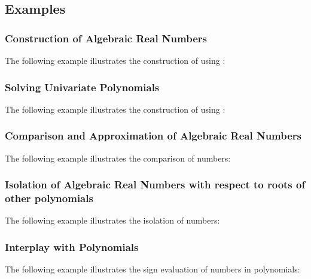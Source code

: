 \clearpage
\subsection{Examples}
\subsubsection{Construction of Algebraic Real Numbers }
The following example illustrates the construction of  
using :
{\small {}}

\clearpage
\subsubsection{Solving Univariate Polynomials}
The following example illustrates the construction of  
using : {\small {} }

\clearpage
\subsubsection{Comparison and Approximation of Algebraic Real Numbers \label{CGAL::AK1::EG::Compare_1} }

The following example illustrates the comparison of  numbers: 
{\small {}}

\clearpage
\subsubsection{Isolation of Algebraic Real Numbers with respect to roots of other polynomials \label{CGAL::AK1::EG::Isolate_1} }

The following example illustrates the isolation of  numbers: 
{\small {}}

\clearpage
\subsubsection{Interplay with Polynomials \label{CGAL::AK1::EG::Sign_at_1} }

The following example illustrates the sign evaluation of  numbers in polynomials:
{\small {}}


